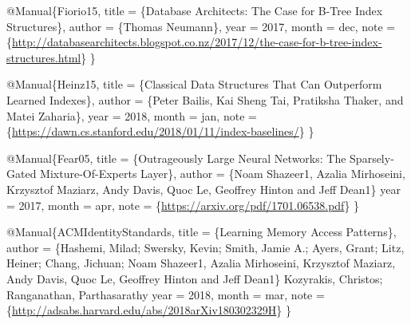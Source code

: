 \documentclass[11pt]{article}
\author{shane}
\date{\today}
\title{}
\begin{document}
\tableofcontents

@Manual\{Fiorio15,
  title =        \{Database Architects: The Case for B-Tree Index Structures\},
  author =       \{Thomas Neumann\},
  year =         2017,
  month =        dec,
  note =         \{\url{http://databasearchitects.blogspot.co.nz/2017/12/the-case-for-b-tree-index-structures.html}\}
\}

@Manual\{Heinz15,
  title =        \{Classical Data Structures That Can Outperform Learned Indexes\},
  author =       \{Peter Bailis, Kai Sheng Tai, Pratiksha Thaker, and Matei Zaharia\},
  year =         2018,
  month =        jan,
  note =         \{\url{https://dawn.cs.stanford.edu/2018/01/11/index-baselines/}\}
\}

@Manual\{Fear05,
  title =        \{Outrageously Large Neural Networks: The Sparsely-Gated Mixture-Of-Experts Layer\},
  author =       \{Noam Shazeer1, Azalia Mirhoseini, Krzysztof Maziarz, Andy Davis, Quoc Le, Geoffrey Hinton and Jeff Dean1\}
  year =         2017,
  month =        apr,
  note =         \{\url{https://arxiv.org/pdf/1701.06538.pdf}\}
\}

@Manual\{ACMIdentityStandards,
  title =        \{Learning Memory Access Patterns\},
  author =       \{Hashemi, Milad; Swersky, Kevin; Smith, Jamie A.; Ayers, Grant; Litz, Heiner; Chang, Jichuan; Noam Shazeer1, Azalia Mirhoseini, Krzysztof Maziarz, Andy Davis, Quoc Le, Geoffrey Hinton and Jeff Dean1\}
Kozyrakis, Christos; Ranganathan, Parthasarathy
  year =         2018,
month = mar,
  note =         \{\url{http://adsabs.harvard.edu/abs/2018arXiv180302329H}\}
\}
\end{document}
